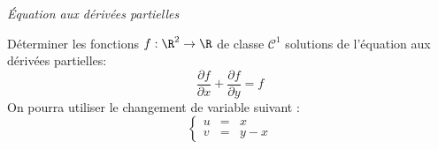 \documentclass[a4paper,10pt]{report}
\begin{document}
\medskip

\begin{center}
\textit{{ {\large Équation aux dérivées partielles}}}
\end{center}

\medskip



\begin{Exa} Déterminer les fonctions $f : \R^{2} \rightarrow \R$ de classe $\mathcal{C}^{1}$ solutions de l'équation aux dérivées partielles:
  \[
  \frac{\partial f}{\partial x} + \frac{\partial f}{\partial y} = f
  \]
On pourra utiliser le changement de variable suivant :
  \[
  \left\lbrace\begin{array}{lll}
    u & = &  x \\
    v & = & y - x
  \end{array}\right.
  \]
\end{Exa} 

\end{document}
